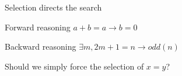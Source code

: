 \begin{frame}{Selection directs the search}
  \begin{block}{Forward reasoning}
    $a + b = a \rightarrow b = 0$
  \end{block}

  \begin{block}{Backward reasoning}
    $\exists m, 2m + 1 = n \rightarrow odd(n)$
  \end{block}
\end{frame}

\begin{frame}
  Should we simply force the selection of $x = y$?
    \begin{prooftree}
    \end{prooftree}
\end{frame}
